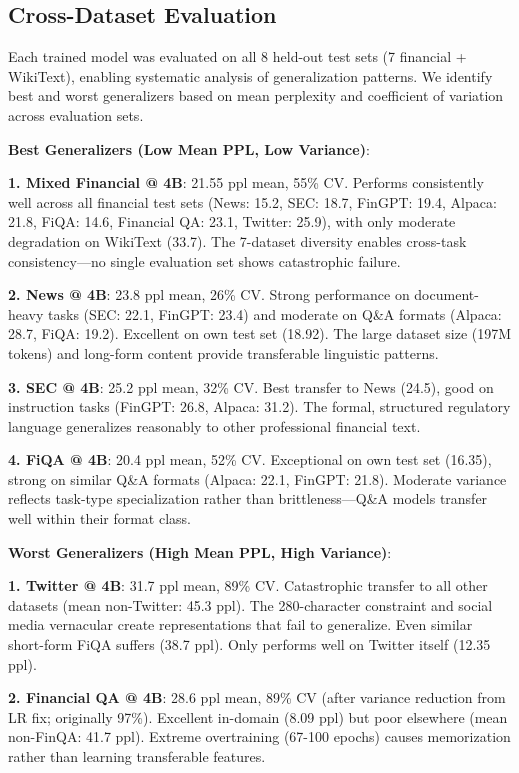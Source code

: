 \subsection{Cross-Dataset Evaluation}

Each trained model was evaluated on all 8 held-out test sets (7 financial + WikiText), enabling systematic analysis of generalization patterns. We identify best and worst generalizers based on mean perplexity and coefficient of variation across evaluation sets.

\textbf{Best Generalizers (Low Mean PPL, Low Variance)}:

\textbf{1. Mixed Financial @ 4B}: 21.55 ppl mean, 55\% CV. Performs consistently well across all financial test sets (News: 15.2, SEC: 18.7, FinGPT: 19.4, Alpaca: 21.8, FiQA: 14.6, Financial QA: 23.1, Twitter: 25.9), with only moderate degradation on WikiText (33.7). The 7-dataset diversity enables cross-task consistency—no single evaluation set shows catastrophic failure.

\textbf{2. News @ 4B}: 23.8 ppl mean, 26\% CV. Strong performance on document-heavy tasks (SEC: 22.1, FinGPT: 23.4) and moderate on Q\&A formats (Alpaca: 28.7, FiQA: 19.2). Excellent on own test set (18.92). The large dataset size (197M tokens) and long-form content provide transferable linguistic patterns.

\textbf{3. SEC @ 4B}: 25.2 ppl mean, 32\% CV. Best transfer to News (24.5), good on instruction tasks (FinGPT: 26.8, Alpaca: 31.2). The formal, structured regulatory language generalizes reasonably to other professional financial text.

\textbf{4. FiQA @ 4B}: 20.4 ppl mean, 52\% CV. Exceptional on own test set (16.35), strong on similar Q\&A formats (Alpaca: 22.1, FinGPT: 21.8). Moderate variance reflects task-type specialization rather than brittleness—Q\&A models transfer well within their format class.

\textbf{Worst Generalizers (High Mean PPL, High Variance)}:

\textbf{1. Twitter @ 4B}: 31.7 ppl mean, 89\% CV. Catastrophic transfer to all other datasets (mean non-Twitter: 45.3 ppl). The 280-character constraint and social media vernacular create representations that fail to generalize. Even similar short-form FiQA suffers (38.7 ppl). Only performs well on Twitter itself (12.35 ppl).

\textbf{2. Financial QA @ 4B}: 28.6 ppl mean, 89\% CV (after variance reduction from LR fix; originally 97\%). Excellent in-domain (8.09 ppl) but poor elsewhere (mean non-FinQA: 41.7 ppl). Extreme overtraining (67-100 epochs) causes memorization rather than learning transferable features.

